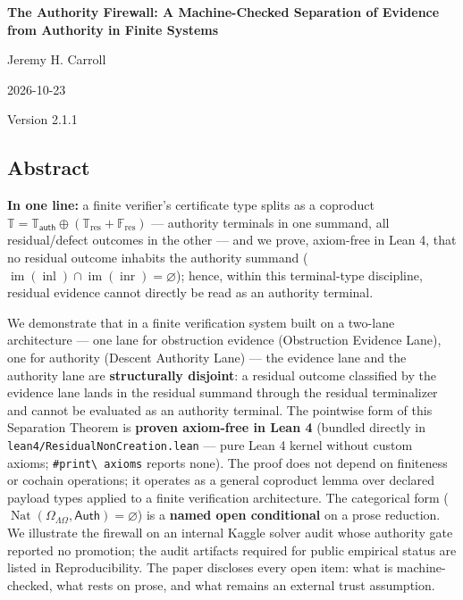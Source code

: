 \documentclass[
  10pt,
]{article}
\author{}
\date{}
\DeclareRobustCommand{\texttt}[1]{{\paperSymbolFont\nolinkurl{#1}}}
\begin{document}
\begin{center}
{\LARGE\bfseries The Authority Firewall: A Machine-Checked Separation of Evidence from
Authority in Finite Systems\par}
Jeremy H. Carroll\par
2026-10-23\par
Version 2.1.1\par
\end{center}

\subsection{Abstract}\label{abstract}

\textbf{In one line:} a finite verifier's certificate type splits as a coproduct \protect\hypertarget{math-E0001-0001}{}{\(\mathbb{T}=\mathbb{T}_{\mathsf{auth}}\oplus(\mathbb{T}_{\mathrm{res}}+\mathbb{F}_{\mathrm{res}})\)} --- authority terminals in one summand, all residual/defect outcomes in the other --- and we prove, axiom-free in Lean 4, that no residual outcome inhabits the authority summand (\protect\hypertarget{math-E0002-0002}{}{\(\operatorname{im}(\operatorname{inl}) \cap \operatorname{im}(\operatorname{inr}) = \varnothing\)}); hence, within this terminal-type discipline, residual evidence cannot directly be read as an authority terminal.

We demonstrate that in a finite verification system built on a two-lane architecture --- one lane for obstruction evidence (Obstruction Evidence Lane), one for authority (Descent Authority Lane) --- the evidence lane and the authority lane are \textbf{structurally disjoint}: a residual outcome classified by the evidence lane lands in the residual summand through the residual terminalizer and cannot be evaluated as an authority terminal. The pointwise form of this Separation Theorem is \textbf{proven axiom-free in Lean 4} (bundled directly in \texttt{lean4/ResidualNonCreation.lean} --- pure Lean 4 kernel without custom axioms; \texttt{\#print\ axioms} reports none). The proof does not depend on finiteness or cochain operations; it operates as a general coproduct lemma over declared payload types applied to a finite verification architecture. The categorical form (\protect\hypertarget{math-E0003-0003}{}{\(\operatorname{Nat}(\Omega_{\Lambda\Omega}, \mathsf{Auth}) = \varnothing\)}) is a \textbf{named open conditional} on a prose reduction. We illustrate the firewall on an internal Kaggle solver audit whose authority gate reported no promotion; the audit artifacts required for public empirical status are listed in Reproducibility. The paper discloses every open item: what is machine-checked, what rests on prose, and what remains an external trust assumption.
\end{document}
